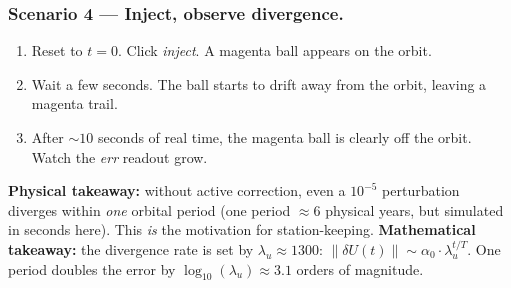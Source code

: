 \documentclass[11pt,a4paper]{article}
\begin{document}
\subsubsection*{Scenario 4 --- Inject, observe divergence.}
\begin{enumerate}[leftmargin=*]
  \item Reset to $t=0$. Click \emph{inject}. A magenta ball appears on the orbit.
  \item Wait a few seconds. The ball starts to drift away from the orbit, leaving a magenta trail.
  \item After $\sim 10$ seconds of real time, the magenta ball is clearly off the orbit. Watch the \emph{err} readout grow.
\end{enumerate}
\textbf{Physical takeaway:} without active correction, even a $10^{-5}$ perturbation diverges within \emph{one} orbital period (one period $\approx 6$ physical years, but simulated in seconds here). This \emph{is} the motivation for station-keeping.
\textbf{Mathematical takeaway:} the divergence rate is set by $\lambda_u \approx 1300$: $\|\delta U(t)\| \sim \alpha_0 \cdot \lambda_u^{t/T}$. One period doubles the error by $\log_{10}(\lambda_u) \approx 3.1$ orders of magnitude.
\end{document}
